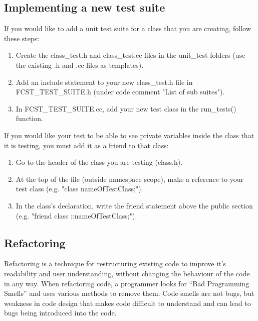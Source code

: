 \subsection{Implementing a new test suite}

If you would like to add a unit test suite for a class that you are creating, follow these steps:

\begin{enumerate}
 \item Create the class\_test.h and class\_test.cc files in the unit\_test folders (use the existing .h and .cc files as templates).
 \item Add an include statement to your new class\_test.h file in FCST\_TEST\_SUITE.h (under code comment "List of sub suites").
 \item In FCST\_TEST\_SUITE.cc, add your new test class in the run\_tests() function.
\end{enumerate}

If you would like your test to be able to see private variables inside the class that it is testing, you must add it as a friend to that class:
\begin{enumerate}
 \item Go to the header of the class you are testing (class.h).
 \item At the top of  the file (outside namespace scope), make a reference to your test class (e.g. "class nameOfTestClass;").
 \item In the class's declaration, write the friend statement above the public section (e.g. "friend class ::nameOfTestClass;").
\end{enumerate}

\subsection{Refactoring}
Refactoring is a technique for restructuring existing code to improve it's readability and user understanding, without changing the behaviour of the code in any way. When refactoring code, a programmer looks for ``Bad Programming Smells'' and uses various methods to remove them. Code smells are not bugs, but weakness in code design that makes code difficult to understand and can lead to bugs being introduced into the code.
      
